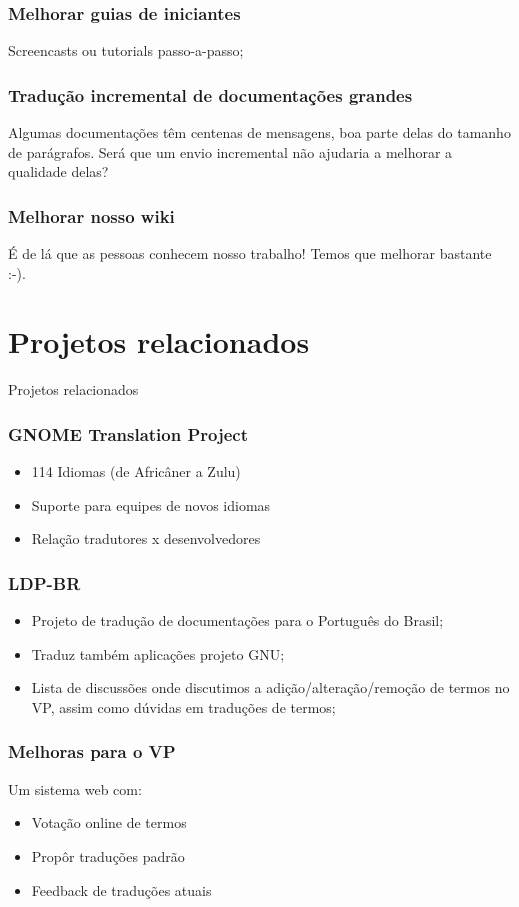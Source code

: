 \documentclass{beamer}
\begin{document}
\begin{frame}
    \frametitle{Melhorar guias de iniciantes}
    Screencasts ou tutorials passo-a-passo;
\end{frame}

\begin{frame}
    \frametitle{Tradução incremental de documentações grandes}
    Algumas documentações têm centenas de mensagens, boa parte delas do tamanho de parágrafos. 
    Será que um envio incremental não ajudaria a melhorar a qualidade delas?
\end{frame}

\begin{frame}
    \frametitle{Melhorar nosso wiki}
    É de lá que as pessoas conhecem nosso trabalho! Temos que melhorar bastante :-).
\end{frame}

\section{Projetos relacionados}

\begin{frame}
  \centering
  \Huge{Projetos relacionados}
\end{frame}



\begin{frame}
  \frametitle{GNOME Translation Project}
  \begin{itemize}[<+->]
    \item 114 Idiomas (de Africâner a Zulu)
    \item Suporte para equipes de novos idiomas
    \item Relação tradutores x desenvolvedores
  \end{itemize}
\end{frame}

\begin{frame}
  \frametitle{LDP-BR}
  \begin{itemize}[<+->]
    \item Projeto de tradução de documentações para o Português do Brasil;
    \item Traduz também aplicações projeto GNU;
    \item Lista de discussões onde discutimos a adição/alteração/remoção de termos no VP, assim como dúvidas em traduções de termos; 
  \end{itemize}
\end{frame}

\begin{frame}
  \frametitle{Melhoras para o VP}
  Um sistema web com:
  \begin{itemize}[<+->]
    \item Votação online de termos
    \item Propôr traduções padrão
    \item Feedback de traduções atuais 
  \end{itemize}
\end{frame}
\end{document}
